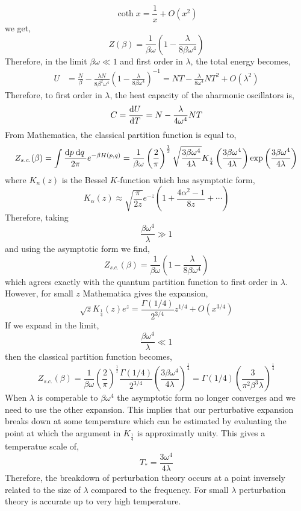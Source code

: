 \documentclass[12pt]{article}
\begin{document}
\[ 
\coth{x} = \frac{1}{x} + O(x^2) 
\]
we get,
\[ Z(\beta) = \frac{1}{\beta \omega} \left(1 - \frac{\lambda}{8 \beta \omega^4} \right) \]
Therefore, in the limit $\beta \omega \ll 1$ and first order in $\lambda$, the total energy becomes,
\begin{align*}
U & = \frac{N}{\beta} - \frac{\lambda N}{8 \beta^2 \omega^4} \left( 1 - \frac{\lambda}{8 \beta \omega^4} \right)^{-1} = N T - \frac{\lambda}{8 \omega^4} N T^2 + O(\lambda^2)
\end{align*}
Therefore, to first order in $\lambda$, the heat capacity of the aharmonic oscillators is,
\[ C = \frac{\mathrm{d}U \:}{\mathrm{d}T \:} = N - \frac{\lambda}{4 \omega^4} N T \]
From Mathematica, the classical partition function is equal to,
\[ Z_{s.c.}(\beta) = \int \frac{\mathrm{d}p \:\mathrm{d}q \:}{2\pi} e^{- \beta H(p,q)} =  \frac{1}{\beta \omega} \left( \frac{2}{\pi} \right)^{\frac{1}{2}} \sqrt{\frac{3 \beta \omega^4}{4 \lambda}} K_{\frac{1}{4}} \left( \frac{3 \beta \omega^4}{4 \lambda} \right) \exp \left( \frac{3 \beta \omega^4}{4 \lambda} \right)  \]
where $K_n(z)$ is the Bessel $K$-function which has asymptotic form,
\[ K_{\alpha}(z) \approx \sqrt{\frac{\pi}{2 z}} e^{-z} \left(1 + \frac{4 \alpha^2 - 1}{8 z} + \cdots \right) \]
Therefore, taking
\[ \frac{\beta \omega^4}{\lambda} \gg 1 \]
and using the asymptotic form we find,
\[ Z_{s.c.}(\beta) = \frac{1}{\beta \omega} \left( 1 - \frac{\lambda}{8 \beta \omega^4} \right) \]
which agrees exactly with the quantum partition function to first order in $\lambda$. 
However, for small $z$ Mathematica gives the expansion,
\[ 
\sqrt{z} K_{\frac{1}{4}}(z) e^z = \frac{\Gamma(1/4)}{2^{3/4}} z^{1/4} + O(x^{3/4}) \]
If we expand in the limit,
\[ \frac{\beta \omega^4}{\lambda} \ll 1 \]
then the classical partition function becomes,
\[ Z_{s.c.}(\beta) = \frac{1}{\beta \omega} \left( \frac{2}{\pi} \right)^{\frac{1}{2}} \frac{\Gamma(1/4)}{2^{3/4}} \left( \frac{3 \beta \omega^4}{4 \lambda} \right)^{\frac{1}{4}} = \Gamma(1/4) \left( \frac{3}{\pi^2 \beta^3 \lambda} \right)^{\frac{1}{4}}  \]
When $\lambda$ is comperable to $\beta \omega^4$ the asymptotic form no longer converges and we need to use the other expansion. This implies that our perturbative expansion breaks down at some temperature which can be estimated by evaluating the point at which the argument in $K_{\frac{1}{4}}$ is approximatly unity. This gives a temperatue scale of,
\[ T_{*} = \frac{3 \omega^4}{4 \lambda} \]
Therefore, the breakdown of perturbation theory occurs at a point inversely related to the size of $\lambda$ compared to the frequency. For small $\lambda$ perturbation theory is accurate up to very high temperature.
\end{document}
